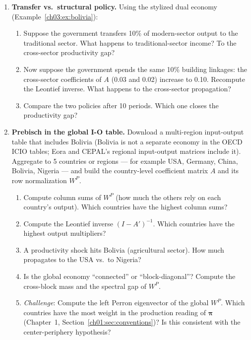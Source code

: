 \documentclass[../structural_economics_book.tex]{subfiles}
\begin{document}
\begin{enumerate}[label=\textbf{3.\arabic*}, leftmargin=3em]
\item \textbf{Transfer vs.\ structural policy.} Using the stylized dual economy (Example~\ref{ch03:ex:bolivia}):
\begin{enumerate}
\item Suppose the government transfers 10\% of modern-sector output to the traditional sector. What happens to traditional-sector income? To the cross-sector productivity gap?
\item Now suppose the government spends the same 10\% building linkages: the cross-sector coefficients of $A$ (0.03 and 0.02) increase to 0.10. Recompute the Leontief inverse. What happens to the cross-sector propagation?
\item Compare the two policies after 10 periods. Which one closes the productivity gap?
\end{enumerate}

\item \textbf{Prebisch in the global I-O table.} Download a multi-region input-output table that includes Bolivia (Bolivia is not a separate economy in the OECD ICIO tables; Eora and CEPAL's regional input-output matrices include it). Aggregate to 5 countries or regions --- for example USA, Germany, China, Bolivia, Nigeria --- and build the country-level coefficient matrix $A$ and its row normalization $W^P$.
\begin{enumerate}
\item Compute column sums of $W^P$ (how much the others rely on each country's output). Which countries have the highest column sums?
\item Compute the Leontief inverse $(I - A')^{-1}$. Which countries have the highest output multipliers?
\item A productivity shock hits Bolivia (agricultural sector). How much propagates to the USA vs.\ to Nigeria?
\item Is the global economy ``connected'' or ``block-diagonal''? Compute the cross-block mass and the spectral gap of $W^P$.
\item \textit{Challenge}: Compute the left Perron eigenvector of the global $W^P$. Which countries have the most weight in the production reading of $\boldsymbol{\pi}$ (Chapter~1, Section~\ref{ch01:sec:conventions})? Is this consistent with the center-periphery hypothesis?
\end{enumerate}


\end{enumerate}
\end{document}
